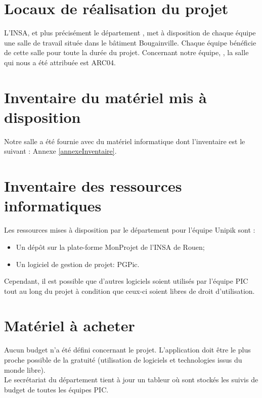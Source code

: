 \section{Locaux de réalisation du projet}
\label{Locaux de réalisation du projet}
\indent L'INSA, et plus précisément le département \ASI{}, met à disposition de chaque équipe une salle de travail située dans le bâtiment Bougainville. Chaque équipe \PIC{} bénéficie de cette salle pour toute la durée du projet.
Concernant notre équipe, \nomEquipe, la salle qui nous a été attribuée est ARC04.

\section{Inventaire du matériel mis à disposition}
\label{Inventaire du matériel mis à disposition}
Notre salle \PICCourt a été fournie avec du matériel informatique dont l'inventaire est le suivant : Annexe \ref{annexeInventaire}.

\section{Inventaire des ressources informatiques}
\label{Inventaire des ressources informatiques}
Les ressources mises à disposition par le département \ASI{} pour l'équipe Unipik sont :

\begin{itemize}
	\item Un dépôt \git{} sur la plate-forme MonProjet de l'INSA de Rouen;
	\item Un logiciel de gestion de projet: PGPic.\\
\end{itemize}

Cependant, il est possible que d'autres logiciels soient utilisés par l'équipe PIC tout au long du projet à condition que ceux-ci soient libres de droit d'utilisation.

\section{Matériel à acheter}
\label{Matériel à acheter}
\indent Aucun budget n'a été défini concernant le projet. L'application doit être le plus proche possible de la gratuité (utilisation de logiciels et technologies issus du monde libre). \\
\indent Le secrétariat du département tient à jour un tableur où sont stockés les suivis de budget de toutes les équipes PIC.

